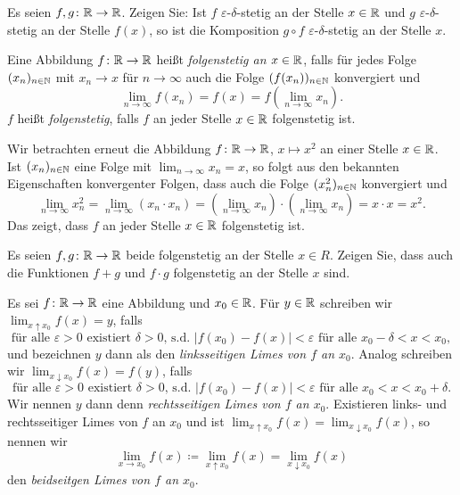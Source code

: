 \documentclass[a4paper,10pt]{article}
\begin{document}
\begin{question}
 Es seien $f, g \colon \mathbb{R} \to \mathbb{R}$. Zeigen Sie: Ist $f$ $\varepsilon$-$\delta$-stetig an der Stelle $x \in \mathbb{R}$ und $g$ $\varepsilon$-$\delta$-stetig an der Stelle $f(x)$, so ist die Komposition $g \circ f$ $\varepsilon$-$\delta$-stetig an der Stelle $x$.
\end{question}


\begin{defi}
 Eine Abbildung $f \colon \mathbb{R} \to \mathbb{R}$ heißt \emph{folgenstetig an $x \in \mathbb{R}$}, falls für jedes Folge $(x_n)_{n \in \mathbb{N}}$ mit $x_n \to x$ für $n \to \infty$ auch die Folge $(f(x_n))_{n \in \mathbb{N}}$ konvergiert und
 \[
  \lim_{n \to \infty} f(x_n) = f(x) = f\left(\lim_{n \to \infty} x_n\right).
 \]
 $f$ heißt \emph{folgenstetig}, falls $f$ an jeder Stelle $x \in \mathbb{R}$ folgenstetig ist.
\end{defi}


\begin{bsp}
 Wir betrachten erneut die Abbildung $f \colon \mathbb{R} \to \mathbb{R}$, $x \mapsto x^2$ an einer Stelle $x \in \mathbb{R}$. Ist $(x_n)_{n \in \mathbb{N}}$ eine Folge mit $\lim_{n \to \infty} x_n = x$, so folgt aus den bekannten Eigenschaften konvergenter Folgen, dass auch die Folge $(x_n^2)_{n \in \mathbb{N}}$ konvergiert und
 \[
  \lim_{n \to \infty} x_n^2
  = \lim_{n \to \infty} (x_n \cdot x_n)
  = \left(\lim_{n \to \infty} x_n\right) \cdot \left(\lim_{n \to \infty} x_n\right)
  = x \cdot x
  = x^2.
 \]
 Das zeigt, dass $f$ an jeder Stelle $x \in \mathbb{R}$ folgenstetig ist.
\end{bsp}


\begin{question}
 Es seien $f, g \colon \mathbb{R} \to \mathbb{R}$ beide folgenstetig an der Stelle $x \in R$. Zeigen Sie, dass auch die Funktionen $f+g$ und $f \cdot g$ folgenstetig an der Stelle $x$ sind.
\end{question}



\begin{defi}
 Es sei $f \colon \mathbb{R} \to \mathbb{R}$ eine Abbildung und $x_0 \in \mathbb{R}$. Für $y \in \mathbb{R}$ schreiben wir $\lim_{x \uparrow x_0} f(x) = y$, falls
 \[
  \text{für alle $\varepsilon > 0$ existiert $\delta > 0$, s.d.\ $|f(x_0)-f(x)| < \varepsilon$ für alle $x_0-\delta < x < x_0$},
 \]
 und bezeichnen $y$ dann als den \emph{linksseitigen Limes von $f$ an $x_0$}. Analog schreiben wir \mbox{$\lim_{x \downarrow x_0} f(x) = f(y)$}, falls
 \[
  \text{für alle $\varepsilon > 0$ existiert $\delta > 0$, s.d.\ $|f(x_0)-f(x)| < \varepsilon$ für alle $x_0 < x < x_0+\delta$}.
 \]
 Wir nennen $y$ dann denn \emph{rechtsseitigen Limes von $f$ an $x_0$}. Existieren links- und rechtsseitiger Limes von $f$ an $x_0$ und ist $\lim_{x \uparrow x_0} f(x) = \lim_{x \downarrow x_0} f(x)$, so nennen wir
 \[
  \lim_{x \to x_0} f(x) \coloneqq \lim_{x \uparrow x_0} f(x) = \lim_{x \downarrow x_0} f(x)
 \]
 den \emph{beidseitgen Limes von $f$ an $x_0$}.
\end{defi}
\end{document}
